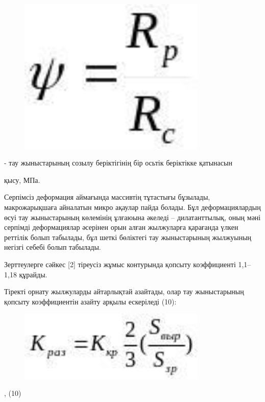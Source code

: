 \begin{figure}[H]
	\centering
	\includegraphics[width=0.8\textwidth]{assets/1297}
	\caption*{}
\end{figure} - тау жыныстарының созылу
беріктігінің бір осьтік беріктікке қатынасын

қысу, МПа.

Серпімсіз деформация аймағында массивтің тұтастығы бұзылады,
макрожарықшаға айналатын микро ақаулар пайда болады. Бұл
деформациялардың өсуі тау жыныстарының көлемінің ұлғаюына әкеледі --
дилатанттылық, оның мәні серпімді деформациялар әсерінен орын алған
жылжуларға қарағанда үлкен реттілік болып табылады, бұл шеткі бөліктегі
тау жыныстарының жылжуының негізгі себебі болып табылады.

Зерттеулерге сәйкес {[}2{]} тіреусіз жұмыс контурында қопсыту
коэффициенті 1,1--1,18 құрайды.

Тіректі орнату жылжуларды айтарлықтай азайтады, олар тау жыныстарының
қопсыту коэффициентін азайту арқылы ескеріледі (10):

\begin{figure}[H]
	\centering
	\includegraphics[width=0.8\textwidth]{assets/1298}
	\caption*{}
\end{figure}, (10)

